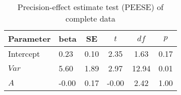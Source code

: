 \begin{table}[ht]
\centering
\caption{Precision-effect estimate test (PEESE) of complete data} 
\label{tab:PEESE}
\begingroup\small
\begin{tabular}{llcccc}
  \hline
Parameter & beta & SE & $t$ & $df$ & $p$ \\ 
  \hline
Intercept & 0.23 & 0.10 & 2.35 & 1.63 & 0.17 \\ 
  $Var$ & 5.60 & 1.89 & 2.97 & 12.94 & 0.01 \\ 
  $A$ & -0.00 & 0.17 & -0.00 & 2.42 & 1.00 \\ 
   \hline
\end{tabular}
\endgroup
\end{table}

